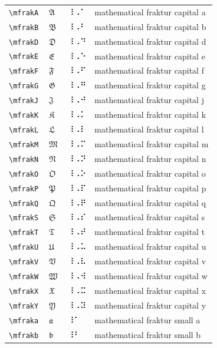 \documentclass[oneside]{article}
\begin{document}
\begin{longtable}{llll}
\verb|\mfrakA| & $\mfrakA$ &  ⠸⠠⠁  & {mathematical fraktur capital a} \\[2ex]
\verb|\mfrakB| & $\mfrakB$ &  ⠸⠠⠃  & {mathematical fraktur capital b} \\[2ex]
\verb|\mfrakD| & $\mfrakD$ &  ⠸⠠⠙  & {mathematical fraktur capital d} \\[2ex]
\verb|\mfrakE| & $\mfrakE$ &  ⠸⠠⠑  & {mathematical fraktur capital e} \\[2ex]
\verb|\mfrakF| & $\mfrakF$ &  ⠸⠠⠋  & {mathematical fraktur capital f} \\[2ex]
\verb|\mfrakG| & $\mfrakG$ &  ⠸⠠⠛  & {mathematical fraktur capital g} \\[2ex]
\verb|\mfrakJ| & $\mfrakJ$ &  ⠸⠠⠚  & {mathematical fraktur capital j} \\[2ex]
\verb|\mfrakK| & $\mfrakK$ &  ⠸⠠⠅  & {mathematical fraktur capital k} \\[2ex]
\verb|\mfrakL| & $\mfrakL$ &  ⠸⠠⠇  & {mathematical fraktur capital l} \\[2ex]
\verb|\mfrakM| & $\mfrakM$ &  ⠸⠠⠍  & {mathematical fraktur capital m} \\[2ex]
\verb|\mfrakN| & $\mfrakN$ &  ⠸⠠⠝  & {mathematical fraktur capital n} \\[2ex]
\verb|\mfrakO| & $\mfrakO$ &  ⠸⠠⠕  & {mathematical fraktur capital o} \\[2ex]
\verb|\mfrakP| & $\mfrakP$ &  ⠸⠠⠏  & {mathematical fraktur capital p} \\[2ex]
\verb|\mfrakQ| & $\mfrakQ$ &  ⠸⠠⠟  & {mathematical fraktur capital q} \\[2ex]
\verb|\mfrakS| & $\mfrakS$ &  ⠸⠠⠎  & {mathematical fraktur capital s} \\[2ex]
\verb|\mfrakT| & $\mfrakT$ &  ⠸⠠⠞  & {mathematical fraktur capital t} \\[2ex]
\verb|\mfrakU| & $\mfrakU$ &  ⠸⠠⠥  & {mathematical fraktur capital u} \\[2ex]
\verb|\mfrakV| & $\mfrakV$ &  ⠸⠠⠧  & {mathematical fraktur capital v} \\[2ex]
\verb|\mfrakW| & $\mfrakW$ &  ⠸⠠⠺  & {mathematical fraktur capital w} \\[2ex]
\verb|\mfrakX| & $\mfrakX$ &  ⠸⠠⠭  & {mathematical fraktur capital x} \\[2ex]
\verb|\mfrakY| & $\mfrakY$ &  ⠸⠠⠽  & {mathematical fraktur capital y} \\[2ex]
\verb|\mfraka| & $\mfraka$ &  ⠸⠁  & {mathematical fraktur small a} \\[2ex]
\verb|\mfrakb| & $\mfrakb$ &  ⠸⠃  & {mathematical fraktur small b} \\[2ex]

\end{longtable}
\end{document}
